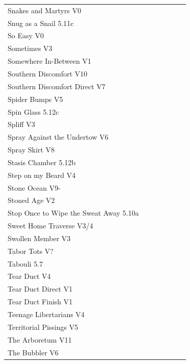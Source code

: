 \begin{flushleft}
\begin{center}
\begin{supertabular}{p{0.76\linewidth}p{0.08\linewidth}}
Snakes and Martyrs V0 & \pageref{rt:Snakes and Martyrs} \\
Snug as a Snail 5.11c & \pageref{rt:Snug as a Snail} \\
So Easy V0 & \pageref{rt:So Easy} \\
Sometimes V3 & \pageref{rt:Sometimes} \\
Somewhere In-Between V1 & \pageref{rt:Somewhere In-Between} \\
Southern Discomfort V10 & \pageref{rt:Southern Discomfort} \\
Southern Discomfort Direct V7 & \pageref{vr:Southern Discomfort Direct} \\
Spider Bumps V5 & \pageref{rt:Spider Bumps} \\
Spin Glass 5.12c & \pageref{rt:Spin Glass} \\
Spliff V3 & \pageref{rt:Spliff} \\
Spray Against the Undertow V6 & \pageref{vr:Spray Against the Undertow} \\
Spray Skirt V8 & \pageref{rt:Spray Skirt} \\
Stasis Chamber 5.12b & \pageref{rt:Stasis Chamber} \\
Step on my Beard V4 & \pageref{vr:Step on my Beard} \\
Stone Ocean V9- & \pageref{rt:Stone Ocean} \\
Stoned Age V2 & \pageref{rt:Stoned Age} \\
Stop Once to Wipe the Sweat Away 5.10a & \pageref{rt:Stop Once to Wipe the Sweat Away} \\
Sweet Home Traverse V3/4 & \pageref{vr:Sweet Home Traverse} \\
Swollen Member V3 & \pageref{rt:Swollen Member} \\
Tabor Tots V? & \pageref{vr:Tabor Tots} \\
Tabouli 5.7 & \pageref{rt:Tabouli} \\
Tear Duct V4 & \pageref{rt:Tear Duct} \\
Tear Duct Direct V1 & \pageref{vr:Tear Duct Direct} \\
Tear Duct Finish V1 & \pageref{rt:Tear Duct Finish} \\
Teenage Libertarians V4 & \pageref{rt:Teenage Libertarians} \\
Territorial Pissings V5 & \pageref{rt:Territorial Pissings} \\
The Arboretum V11 & \pageref{rt:The Arboretum} \\
The Bubbler V6 & \pageref{rt:The Bubbler} \\

\end{supertabular}
\end{center}
\end{flushleft}
